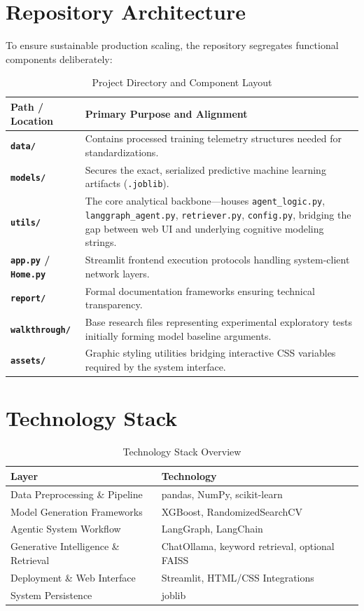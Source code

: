 \documentclass[12pt, a4paper]{article}
\begin{document}
\newpage
\section{Repository Architecture}

To ensure sustainable production scaling, the repository segregates functional components deliberately:

\begin{table}[H]
\centering
\caption{Project Directory and Component Layout}
\begin{tabularx}{\textwidth}{lX}
\toprule
\textbf{Path / Location} & \textbf{Primary Purpose and Alignment} \\
\midrule
\textbf{\texttt{data/}} & Contains processed training telemetry structures needed for standardizations.\\
\textbf{\texttt{models/}} & Secures the exact, serialized predictive machine learning artifacts (\texttt{.joblib}). \\
\textbf{\texttt{utils/}} & The core analytical backbone—houses \texttt{agent\_logic.py}, \texttt{langgraph\_agent.py}, \texttt{retriever.py}, \texttt{config.py}, bridging the gap between web UI and underlying cognitive modeling strings.\\
\textbf{\texttt{app.py} / \texttt{Home.py}} & Streamlit frontend execution protocols handling system-client network layers.\\
\textbf{\texttt{report/}} & Formal documentation frameworks ensuring technical transparency. \\
\textbf{\texttt{walkthrough/}} & Base research files representing experimental exploratory tests initially forming model baseline arguments. \\
\textbf{\texttt{assets/}} & Graphic styling utilities bridging interactive CSS variables required by the system interface.\\
\bottomrule
\end{tabularx}
\end{table}

\section{Technology Stack}

\begin{table}[H]
\centering
\caption{Technology Stack Overview}
\begin{tabular}{ll}
\toprule
\textbf{Layer} & \textbf{Technology} \\
\midrule
Data Preprocessing \& Pipeline & pandas, NumPy, scikit-learn \\
Model Generation Frameworks & XGBoost, RandomizedSearchCV \\
Agentic System Workflow & LangGraph, LangChain \\
Generative Intelligence \& Retrieval & ChatOllama, keyword retrieval, optional FAISS \\
Deployment \& Web Interface & Streamlit, HTML/CSS Integrations \\
System Persistence & joblib \\
\bottomrule
\end{tabular}
\end{table}
\end{document}

